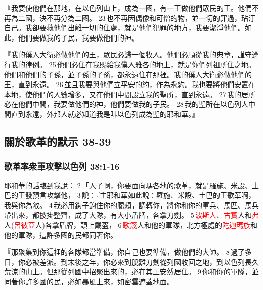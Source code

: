 『我要使他們在那地，在以色列山上，成為一國，有一王做他們眾民的王。他們不再為二國，決不再分為二國。 23 也不再因偶像和可憎的物，並一切的罪過，玷汙自己。我卻要救他們出離一切的住處，就是他們犯罪的地方，我要潔淨他們。如此，他們要做我的子民，我要做他們的神。

『我的僕人大衛必做他們的王，眾民必歸一個牧人。他們必順從我的典章，謹守遵行我的律例。 25 他們必住在我賜給我僕人雅各的地上，就是你們列祖所住之地。他們和他們的子孫，並子孫的子孫，都永遠住在那裡。我的僕人大衛必做他們的王，直到永遠。 26 並且我要與他們立平安的約，作為永約。我也要將他們安置在本地，使他們的人數增多，又在他們中間設立我的聖所，直到永遠。 27 我的居所必在他們中間，我要做他們的神，他們要做我的子民。 28 我的聖所在以色列人中間直到永遠，外邦人就必知道我是叫以色列成為聖的耶和華。』

\subsection{關於歌革的默示 38-39}
\subsubsection{歌革率衆軍攻擊以色列 38:1-16}
耶和華的話臨到我說： 2 「人子啊，你要面向瑪各地的歌革，就是羅施、米設、土巴的王發預言攻擊他， 3 說：『主耶和華如此說：羅施、米設、土巴的王歌革啊，我與你為敵。 4 我必用鉤子鉤住你的腮頰，調轉你，將你和你的軍兵、馬匹、馬兵帶出來，都披掛整齊，成了大隊，有大小盾牌，各拿刀劍。 5 \textcolor{red}{波斯人}、\textcolor{red}{古實}人和\textcolor{red}{弗}人(\textcolor{red}{呂彼亞}人)各拿盾牌，頭上戴盔， 6 \textcolor{red}{歌篾}人和他的軍隊，北方極處的\textcolor{red}{陀迦瑪族}和他的軍隊，這許多國的民都同著你。

『那聚集到你這裡的各隊都當準備，你自己也要準備，做他們的大帥。 8 過了多日，你必被差派。到末後之年，你必來到脫離刀劍從列國收回之地，到以色列長久荒涼的山上。但那從列國中招聚出來的，必在其上安然居住。 9 你和你的軍隊，並同著你許多國的民，必如暴風上來，如密雲遮蓋地面。

